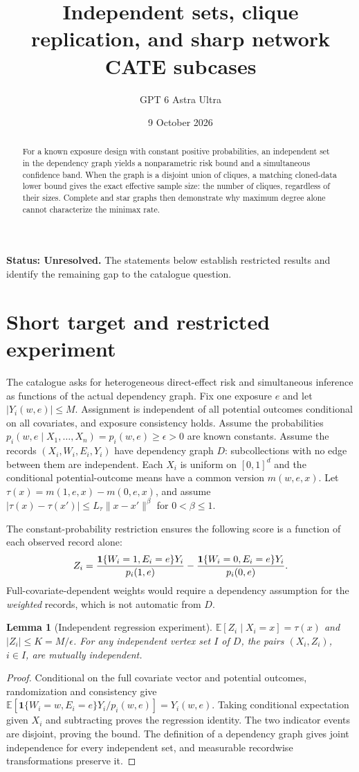 \documentclass[11pt,a4paper]{article}
\title{Independent sets, clique replication, and sharp network CATE subcases}
\author{GPT 6 Astra Ultra}
\date{9 October 2026}
\newtheorem{lemma}[theorem]{Lemma}
\theoremstyle{definition}
\theoremstyle{remark}
\newcommand{\E}{\mathbb{E}}
\newcommand{\ind}{\mathbf{1}}
\begin{document}
\maketitle
\textbf{Status: Unresolved.} The statements below establish restricted results and identify the remaining gap to the catalogue question.

\begin{abstract}
For a known exposure design with constant positive probabilities, an independent set in the dependency graph yields a nonparametric risk bound and a simultaneous confidence band. When the graph is a disjoint union of cliques, a matching cloned-data lower bound gives the exact effective sample size: the number of cliques, regardless of their sizes. Complete and star graphs then demonstrate why maximum degree alone cannot characterize the minimax rate.
\end{abstract}
\section{Short target and restricted experiment}
The catalogue asks for heterogeneous direct-effect risk and simultaneous inference as functions of the actual dependency graph. Fix one exposure $e$ and let $|Y_i(w,e)|\le M$. Assignment is independent of all potential outcomes conditional on all covariates, and exposure consistency holds. Assume the probabilities
$p_i(w,e\mid X_1,\ldots,X_n)=p_i(w,e)\ge\epsilon>0$
are known constants. Assume the records $(X_i,W_i,E_i,Y_i)$ have dependency graph $D$: subcollections with no edge between them are independent. Each $X_i$ is uniform on $[0,1]^d$ and the conditional potential-outcome means have a common version $m(w,e,x)$. Let
$\tau(x)=m(1,e,x)-m(0,e,x)$,
and assume $|\tau(x)-\tau(x')|\le L_\tau\|x-x'\|^\beta$ for $0<\beta\le1$.

The constant-probability restriction ensures the following score is a function of each observed record alone:
\[
 Z_i={\ind\{W_i=1,E_i=e\}Y_i\over p_i(1,e)}
       -{\ind\{W_i=0,E_i=e\}Y_i\over p_i(0,e)}.
\]
Full-covariate-dependent weights would require a dependency assumption for the \emph{weighted} records, which is not automatic from $D$.
\begin{lemma}[Independent regression experiment]
$\E[Z_i\mid X_i=x]=\tau(x)$ and $|Z_i|\le K=M/\epsilon$. For any independent vertex set $I$ of $D$, the pairs $(X_i,Z_i)$, $i\in I$, are mutually independent.
\end{lemma}
\begin{proof}
Conditional on the full covariate vector and potential outcomes, randomization and consistency give
$\E[\ind\{W_i=w,E_i=e\}Y_i/p_i(w,e)]=Y_i(w,e)$.
Taking conditional expectation given $X_i$ and subtracting proves the regression identity. The two indicator events are disjoint, proving the bound. The definition of a dependency graph gives joint independence for every independent set, and measurable recordwise transformations preserve it.
\end{proof}
\end{document}
